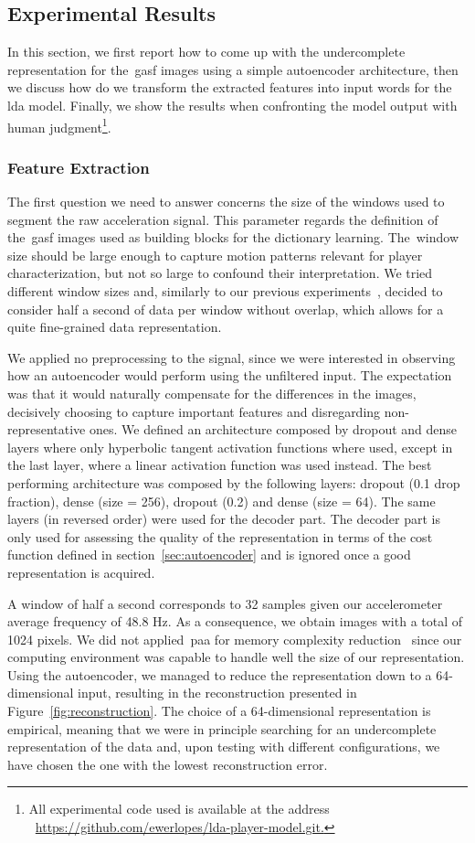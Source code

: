 \subsection{Experimental Results}
In this section, we first report how to come up with the undercomplete representation for the~\gls{gasf} images using a simple autoencoder architecture, then we discuss how do we transform the extracted features into input words for the \gls{lda} model. Finally, we show the results when confronting the model output with human judgment\footnote{All experimental code used is available at the address ~\url{https://github.com/ewerlopes/lda-player-model.git.}}.

\subsubsection{Feature Extraction}
The first question we need to answer concerns the size of the windows used to segment the raw acceleration signal. This parameter regards the definition of the~\gls{gasf} images used as building blocks for the dictionary learning. The~window size should be large enough to capture motion patterns relevant for player characterization, but not so large to confound their interpretation. We tried different window sizes and, similarly to our previous experiments~\citep{oliveira_activity_2017}, decided to consider half a second of data per window without overlap, which allows for a quite fine-grained data representation.

We applied no preprocessing to the signal, since we were interested in observing how an autoencoder would perform using the unfiltered input. The expectation was that it would naturally compensate for the differences in the images, decisively choosing to capture important features and disregarding non-representative ones. We defined an architecture composed by dropout and dense layers where only hyperbolic tangent activation functions where used, except in the last layer, where a linear activation function was used instead. The best performing architecture was composed by the following layers: dropout (0.1 drop fraction), dense (size = 256), dropout (0.2) and dense (size = 64). The same layers (in reversed order) were used for the decoder part. The decoder part is only used for assessing the quality of the representation in terms of the cost function defined in section~\ref{sec:autoencoder} and is ignored once a good representation is acquired.

A window of half a second corresponds to 32 samples given our accelerometer average frequency of 48.8 Hz. As a consequence, we obtain images with a total of 1024 pixels. We did not applied~\gls{paa} for memory complexity reduction~\citep{wang_time_2016} since our computing environment was capable to handle well the size of our representation. Using the autoencoder, we managed to reduce the representation down to a 64-dimensional input, resulting in the reconstruction presented in Figure~\ref{fig:reconstruction}. The choice of a 64-dimensional representation is empirical, meaning that we were in principle searching for an undercomplete representation of the data and, upon testing with different configurations, we have chosen the one with the lowest reconstruction error.  

